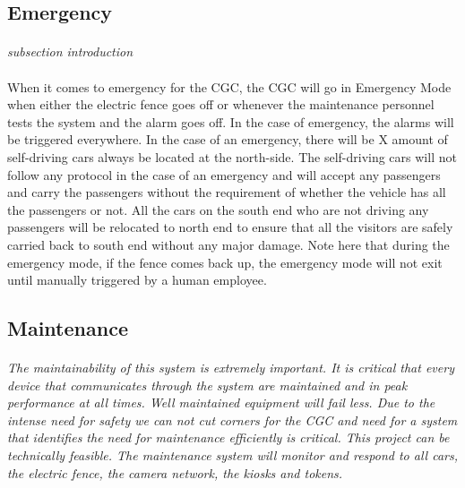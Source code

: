 \documentclass[12pt]{article}
\begin{document}
	\subsection{Emergency}
	\paragraph{} \textit{subsection introduction}
	\paragraph{} When it comes to emergency for the CGC, the CGC will go in Emergency Mode when either the electric fence goes off or whenever the maintenance personnel 
tests the system and the alarm goes off. In the case of emergency, the alarms will be triggered everywhere. In the case of an emergency, there will be X
amount of self-driving cars always be located at the north-side. The self-driving cars will not follow any protocol in the case of an emergency and will 
accept any passengers and carry the passengers without the requirement of whether the vehicle has all the passengers or not. All the cars on the south end 
who are not driving any passengers will be relocated to north end to ensure that all the visitors are safely carried back to south end without any 
major damage. Note here that during the emergency mode, if the fence comes back up, the emergency mode will not exit until manually triggered by a
human employee.
	
	\subsection{Maintenance}
	\paragraph{} \textit{The maintainability of this system is extremely important. 
	It is critical that every device that communicates through the system are maintained 
	and in peak performance at all times. Well maintained equipment will fail less. Due to 
	the intense need for safety we can not cut corners for the CGC and need for a system 
	that identifies the need for maintenance efficiently is critical. This project can 
	be technically feasible. The maintenance system will monitor and respond to all cars, 
	the electric fence, the camera network, the kiosks and tokens.}
	
\end{document}
